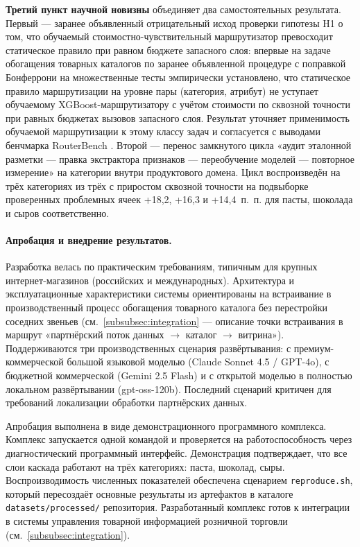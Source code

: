 \textbf{Третий пункт научной новизны} объединяет два самостоятельных результата. Первый — заранее объявленный отрицательный исход проверки гипотезы H1 о том, что обучаемый стоимостно-чувствительный маршрутизатор превосходит статическое правило при равном бюджете запасного слоя: впервые на задаче обогащения товарных каталогов по заранее объявленной процедуре с поправкой Бонферрони на множественные тесты эмпирически установлено, что статическое правило маршрутизации на уровне пары (категория, атрибут) не уступает обучаемому XGBoost-маршрутизатору с учётом стоимости по сквозной точности при равных бюджетах вызовов запасного слоя. Результат уточняет применимость обучаемой маршрутизации к этому классу задач и согласуется с выводами бенчмарка RouterBench \cite{ref_12}. Второй — перенос замкнутого цикла «аудит эталонной разметки — правка экстрактора признаков — переобучение моделей — повторное измерение» на категории внутри продуктового домена. Цикл воспроизведён на трёх категориях из трёх с приростом сквозной точности на подвыборке проверенных проблемных ячеек +18,2, +16,3 и +14,4~п.~п. для пасты, шоколада и сыров соответственно.

\paragraph*{Апробация и внедрение результатов.}

Разработка велась по практическим требованиям, типичным для крупных интернет-магазинов (российских и международных). Архитектура и эксплуатационные характеристики системы ориентированы на встраивание в производственный процесс обогащения товарного каталога без перестройки соседних звеньев (см.~\ref{subsubsec:integration} — описание точки встраивания в маршрут «партнёрский поток данных $\to$ каталог $\to$ витрина»). Поддерживаются три производственных сценария развёртывания: с премиум-коммерческой большой языковой моделью (Claude Sonnet 4.5 / GPT-4o), с бюджетной коммерческой (Gemini 2.5 Flash) и с открытой моделью в полностью локальном развёртывании (gpt-oss-120b). Последний сценарий критичен для требований локализации обработки партнёрских данных.

Апробация выполнена в виде демонстрационного программного комплекса. Комплекс запускается одной командой и проверяется на работоспособность через диагностический программный интерфейс. Демонстрация подтверждает, что все слои каскада работают на трёх категориях: паста, шоколад, сыры. Воспроизводимость численных показателей обеспечена сценарием \texttt{reproduce.sh}, который пересоздаёт основные результаты из артефактов в каталоге \texttt{datasets/processed/} репозитория. Разработанный комплекс готов к интеграции в системы управления товарной информацией розничной торговли (см.~\ref{subsubsec:integration}).

